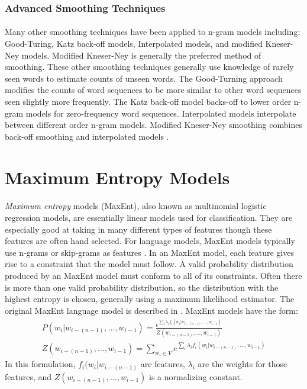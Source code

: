 \documentclass[12pt]{ociamthesis}
\begin{document}
\subsubsection{Advanced Smoothing Techniques}
\paragraph{}
Many other smoothing techniques have been applied to n-gram models including: Good-Turing, Katz back-off models, Interpolated models, and modified Kneser-Ney models. Modified Kneser-Ney is generally the preferred method of smoothing. These other smoothing techniques generally use knowledge of rarely seen words to estimate counts of unseen words. The Good-Turning approach modifies the counts of word sequences to be more similar to other word sequences seen slightly more frequently. The Katz back-off model backs-off to lower order n-gram models for zero-frequency word sequences. Interpolated models interpolate between different order n-gram models. Modified Kneser-Ney smoothing combines back-off smoothing and interpolated models \cite{Jurafsky2009}.

\section{Maximum Entropy  Models}
\paragraph{}
\emph{Maximum entropy} models (MaxEnt), also known as multinomial logistic regression models, are essentially linear models used for classification. They are especially good at taking in many different types of features though these features are often hand selected. For language models, MaxEnt models typically use n-grams or skip-grams as features \cite{Mikolav2012}. In an MaxEnt model, each feature gives rise to a constraint that the model must follow. A valid probability distribution produced by an MaxEnt model must conform to all of its constraints. Often there is more than one valid probability distribution, so the distribution with the highest entropy is chosen, generally using a maximum likelihood estimator. The original MaxEnt language model is described in \cite{Rosenfeld1994}.
MaxEnt models have the form:
\begin{align}
P(w_i | w_{i-(n-1)},\dots, w_{i-1}) = \frac{e^{\sum_i \lambda_i f_i(w_i | w_{i-(n-1)},\dots, w_{i-1})}}{Z(w_{i-(n-1)},
\dots, w_{i-1})} \label{eq:maxent}
\\Z(w_{i-(n-1)},\dots, w_{i-1}) = \sum_{w_i \in V} e^{\sum_i \lambda_i f_i(w_i | w_{i-(n-1)},\dots, w_{i-1})}
\end{align}
In this formulation, $f_i(w_i | w_{i-(n-1)}$ are features, $\lambda_i$ are the weights for those features, and $Z(w_{i-(n-1)},\dots, w_{i-1})$ is a normalizing constant.
\end{document}
